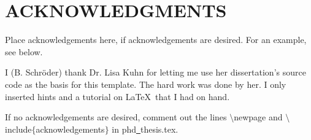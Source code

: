 \chapter*{ACKNOWLEDGMENTS}

Place acknowledgements here, if acknowledgements are desired.
For an example, see below.

I (B. Schr\"oder) thank Dr. Lisa Kuhn for letting me use her
dissertation's source code as the basis for this template.
The hard work was done by her. I only inserted hints and a
tutorial on \LaTeX \
that I had on hand.


If no acknowledgements are desired, comment out
the lines
$\setminus $newpage
and
$\setminus $include$\{ $acknowledgements$\} $
in phd\underline{~}thesis.tex.


